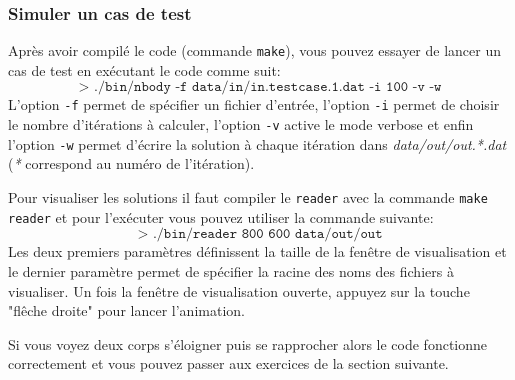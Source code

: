\subsubsection{Simuler un cas de test}
Après avoir compilé le code (commande \texttt{make}), vous pouvez essayer de lancer un cas de test en exécutant le code comme suit:
\begin{equation*}
	\texttt{> ./bin/nbody -f data/in/in.testcase.1.dat -i 100 -v -w}
\end{equation*}
L'option \texttt{-f} permet de spécifier un fichier d'entrée, l'option \texttt{-i} permet de choisir le nombre d'itérations à calculer, l'option \texttt{-v} active le mode verbose et enfin l'option \texttt{-w} permet d'écrire la solution à chaque itération dans \textit{data/out/out.*.dat} (\textit{*} correspond au numéro de l'itération).

Pour visualiser les solutions il faut compiler le \texttt{reader} avec la commande \texttt{make reader} et pour l'exécuter vous pouvez utiliser la commande suivante:
\begin{equation*}
	\texttt{> ./bin/reader 800 600 data/out/out}
\end{equation*}
Les deux premiers paramètres définissent la taille de la fenêtre de visualisation et le dernier paramètre permet de spécifier la racine des noms des fichiers à visualiser.
Un fois la fenêtre de visualisation ouverte, appuyez sur la touche "flêche droite" pour lancer l'animation.

Si vous voyez deux corps s'éloigner puis se rapprocher alors le code fonctionne correctement et vous pouvez passer aux exercices de la section suivante.

